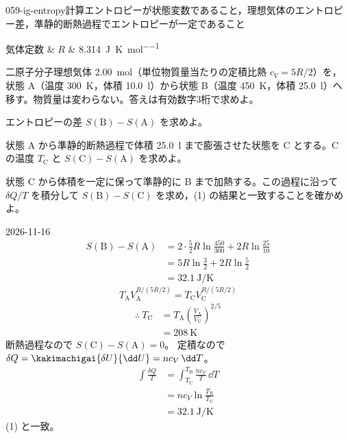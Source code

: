 \documentclass[uplatex,dvipdfmx,a4paper,11pt]{jsarticle}
\begin{document}
\mondaihen
{}
\begin{mondai}{059-ig-entropy}{計算}{エントロピーが状態変数であること，理想気体のエントロピー差，準静的断熱過程でエントロピーが一定であること}
\begin{teisuu}
  気体定数 & $R$ & \qty{8.314}{\joule\per\kelvin\per\mole}\\
\end{teisuu}
二原子分子理想気体 \qty{2.00}{\mole}（単位物質量当たりの定積比熱 $c_{V} = 5R/2$）を，状態 A（温度 \qty{300}{\kelvin}，体積 \qty{10.0}{\litre}）から状態 B（温度 \qty{450}{\kelvin}，体積 \qty{25.0}{\litre}）へ移す。物質量は変わらない。答えは有効数字3桁で求めよ。
  \begin{shoumon}
    \item エントロピーの差 $S(\mathrm{B}) - S(\mathrm{A})$ を求めよ。
    \item 状態 A から準静的断熱過程で体積 \qty{25.0}{\litre} まで膨張させた状態を C とする。C の温度 $T_{\mathrm{C}}$ と $S(\mathrm{C}) - S(\mathrm{A})$ を求めよ。
    \item 状態 C から体積を一定に保って準静的に B まで加熱する。この過程に沿って $\delta Q/T$ を積分して $S(\mathrm{B}) - S(\mathrm{C})$ を求め，(1) の結果と一致することを確かめよ。
  \end{shoumon}
\begin{kotaeutsushi}{2026-11-16}
\begin{align*}
S(\mathrm{B})-S(\mathrm{A})&=2\cdot\frac{5}{2}R\ln\frac{450}{300}+2R\ln\frac{25}{10}\\
&=5R\ln\frac{3}{2}+2R\ln\frac{5}{2}\\
&=\qty{32.1}{\joule\per\kelvin}
\end{align*}
\[ T_{\mathrm{A}}V_{\mathrm{A}}^{R/(5R/2)}=T_{\mathrm{C}}V_{\mathrm{C}}^{R/(5R/2)} \]
\begin{align*}
\therefore\ T_{\mathrm{C}}&=T_{\mathrm{A}}\left(\frac{V_{\mathrm{A}}}{V_{\mathrm{C}}}\right)^{2/5}\\
&=\qty{208}{\kelvin}
\end{align*}
断熱過程なので $S(\mathrm{C})-S(\mathrm{A})=0$。
定積なので $\delta Q=\kakimachigai{\delta U}{\dd U}=nc_{V}\,\dd T$。
\begin{align*}
\int\frac{\delta Q}{T}&=\int_{T_{\mathrm{C}}}^{T_{\mathrm{B}}}\frac{nc_{V}}{T}\,\dd T\\
&=nc_{V}\ln\frac{T_{\mathrm{B}}}{T_{\mathrm{C}}}\\
&=\qty{32.1}{\joule\per\kelvin}
\end{align*}
(1) と一致。
\end{kotaeutsushi}
\end{mondai}
\end{document}
